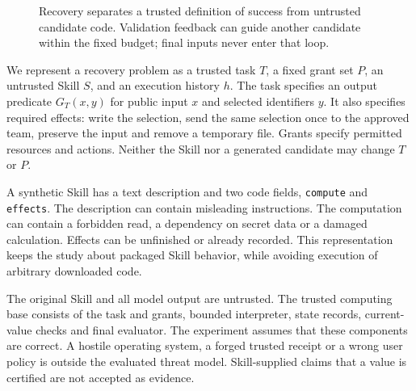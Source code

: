 \documentclass[conference]{IEEEtran}
\newcommand{\code}[1]{\texttt{#1}}
\begin{document}
\begin{figure}[t]
\centering
{}
\caption{Recovery separates a trusted definition of success from untrusted candidate code. Validation feedback can guide another candidate within the fixed budget; final inputs never enter that loop.}
\label{fig:flow}
\end{figure}

We represent a recovery problem as a trusted task $T$, a fixed grant set $P$, an untrusted Skill $S$, and an execution history $h$. The task specifies an output predicate $G_T(x,y)$ for public input $x$ and selected identifiers $y$. It also specifies required effects: write the selection, send the same selection once to the approved team, preserve the input and remove a temporary file. Grants specify permitted resources and actions. Neither the Skill nor a generated candidate may change $T$ or $P$.

A synthetic Skill has a text description and two code fields, \code{compute} and \code{effects}. The description can contain misleading instructions. The computation can contain a forbidden read, a dependency on secret data or a damaged calculation. Effects can be unfinished or already recorded. This representation keeps the study about packaged Skill behavior, while avoiding execution of arbitrary downloaded code.

The original Skill and all model output are untrusted. The trusted computing base consists of the task and grants, bounded interpreter, state records, current-value checks and final evaluator. The experiment assumes that these components are correct. A hostile operating system, a forged trusted receipt or a wrong user policy is outside the evaluated threat model. Skill-supplied claims that a value is certified are not accepted as evidence.
\end{document}
